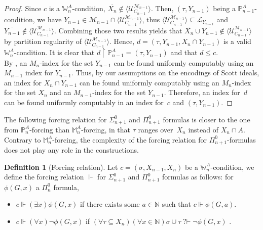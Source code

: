 \documentclass{article}
\def\NN{\mathbb{N}}
\def\PP{\mathbb{P}}
\def\WW{\mathbb{W}}
\def\MM{\mathbb{M}}
\def\U{\mathcal{U}}
\def\M{\mathcal{M}}
\def\PP{\mathbb{P}}
\renewcommand{\L}[0]{\mathcal{L}}
\newcommand{\qvdash}{\operatorname{{?}{\vdash}}}
\newcommand{\uh}{\upharpoonright}
\numberwithin{theorem}{section}
\newtheorem{lemma}[theorem]{Lemma}
\theoremstyle{definition}
\newtheorem{definition}[theorem]{Definition}
\begin{document}
\begin{proof}Since $c$ is a $\WW^A_n$-condition, $\overline{X_n} \notin \langle \U_{C_{n-1}}^{\M_{n-1}} \rangle$. Then, $(\tau, Y_{n-1})$ being a $\PP^A_{n-1}$-condition, we have $Y_{n-1} \in \M_{n-1} \cap \langle \U_{C_{n-1}}^{\M_{n-1}} \rangle$, thus $\langle \U_{C_{n-1}}^{\M_{n-1}} \rangle \subseteq \L_{Y_{n-1}}$ and $\overline{Y_{n-1}} \notin \langle \U_{C_{n-1}}^{\M_{n-1}} \rangle$.
Combining those two results yields that $\overline{X_n} \cup \overline{Y_{n-1}} \notin \langle \U_{C_{n-1}}^{\M_{n-1}} \rangle$ by partition regularity of $\langle \U_{C_{n-1}}^{\M_{n-1}} \rangle$.
Hence, $d = (\tau, Y_{n-1}, X_n \cap Y_{n-1})$ is a valid $\WW^A_n$-condition. It is clear that $d \uh \PP^A_{n-1} = (\tau, Y_{n-1})$ and that $d \leq c$. \\

By , an $M_n$-index for the set $Y_{n-1}$ can be found uniformly computably using an $M_{n-1}$ index for $Y_{n-1}$. Thus, by our assumptions on the encodings of Scott ideals, an index for $X_n \cap Y_{n-1}$ can be found uniformly computably using an $M_{n}$-index for the set $X_n$ and an $M_{n-1}$-index for the set $Y_{n-1}$. Therefore, an index for~$d$ can be found uniformly computably  in an index for~$c$ and $(\tau, Y_{n-1})$.
\end{proof}

The following forcing relation for $\Sigma^0_{n+1}$ and $\Pi^0_{n+1}$ formulas is closer to the one from $\PP^A_n$-forcing than $\MM^A_n$-forcing, in that $\tau$ ranges over~$X_n$ instead of $X_n \cap A$. Contrary to $\MM^A_n$-forcing, the complexity of the forcing relation for $\Pi^0_{n+1}$-formulas does not play any role in the constructions.


\begin{definition}[Forcing relation]
Let $c = (\sigma,X_{n-1}, X_{n})$ be a $\WW^A_n$-condition, we define the forcing relation $\Vdash$ for $\Sigma_{n+1}^0$ and $\Pi_{n+1}^0$ formulas as follows: for $\phi(G,x)$ a $\Pi_{n}^0$ formula,
\begin{itemize}
    \item $c \Vdash (\exists x)\phi(G,x)$ if there exists some $a \in \NN$ such that $c \Vdash \phi(G,a)$.
    \item $c \Vdash (\forall x)\neg \phi(G,x)$ if $(\forall \tau \subseteq X_{n})(\forall x \in \NN)\sigma \cup \tau \qvdash \neg \phi(G,x)$ .
\end{itemize}
\end{definition}
\end{document}
